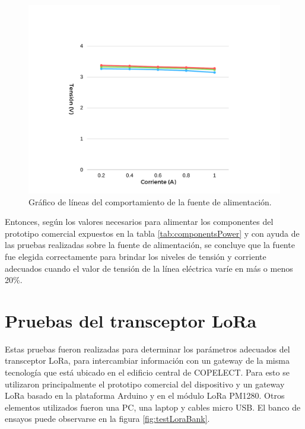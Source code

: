 \begin{figure}[ht]
	\centering
	\includegraphics[scale=0.43]{./Figures/test_power_graph.pdf}
	\caption{Gráfico de líneas del comportamiento de la fuente de alimentación.}
	\label{fig:testPowerGraph}
\end{figure}

Entonces, según los valores necesarios para alimentar los componentes del prototipo comercial expuestos en la tabla \ref{tab:componentsPower} y con ayuda de las pruebas realizadas sobre la fuente de alimentación, se concluye que la fuente fue elegida correctamente para brindar los niveles de tensión y corriente adecuados cuando el valor de tensión de la línea eléctrica varíe en más o menos 20\%.


\section{Pruebas del transceptor LoRa}

Estas pruebas fueron realizadas para determinar los parámetros adecuados del transceptor LoRa, para intercambiar información con un gateway de la misma tecnología que está ubicado en el edificio central de COPELECT. Para esto se utilizaron principalmente el prototipo comercial del dispositivo y un gateway LoRa basado en la plataforma Arduino y en el módulo LoRa PM1280. Otros elementos utilizados fueron una PC, una laptop y cables micro USB. El banco de ensayos puede observarse en la figura \ref{fig:testLoraBank}.

